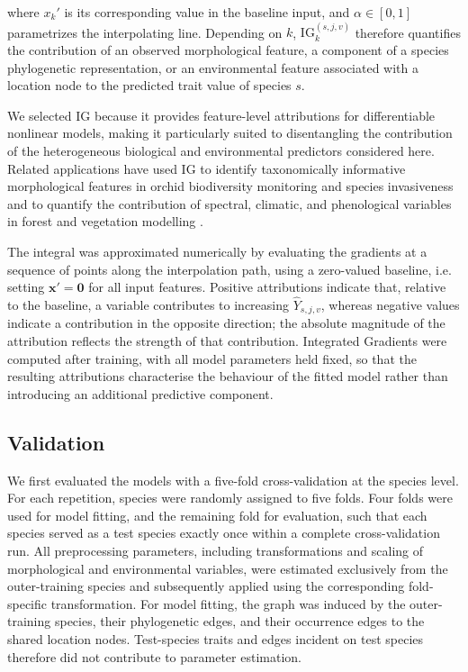\documentclass[preprint,12pt,authoryear]{elsarticle}
\begin{document}
where \(x_k'\) is its corresponding value in the baseline input, and \(\alpha\in[0,1]\) parametrizes the interpolating line. Depending on $k$, $\mathrm{IG}^{(s,j,v)}_k$ therefore quantifies the contribution of an observed morphological feature, a component of a species phylogenetic representation, or an environmental feature associated with a location node to the predicted trait value of species \(s\).

We selected IG because it provides feature-level attributions for differentiable nonlinear models, making it particularly suited to disentangling the contribution of the heterogeneous biological and environmental predictors considered here. Related applications have used IG to identify taxonomically informative morphological features in orchid biodiversity monitoring and species invasiveness \citep{sangiovanni2025orchid,SPINA2026103877} and to quantify the contribution of spectral, climatic, and phenological variables in forest and vegetation modelling \citep{hiebl2026combining}. 

The integral was approximated numerically by evaluating the gradients at a sequence of points along the interpolation path, using a zero-valued baseline, i.e. setting \(\mathbf{x}'=\mathbf{0}\) for all input features.
Positive attributions indicate that, relative to the baseline, a variable contributes to increasing \(\hat{Y}_{s,j,v}\), whereas negative values indicate a contribution in the opposite direction; the absolute magnitude of the attribution reflects the strength of that contribution. Integrated Gradients were computed after training, with all model parameters held fixed, so that the resulting attributions characterise the behaviour of the fitted model rather than introducing an additional predictive component.


\subsection{Validation}
We first evaluated the models with a five-fold cross-validation at the species level. For each repetition, species were randomly assigned to five folds. Four folds were used for model fitting, and the remaining fold for evaluation, such that each species served as a test species exactly once within a complete cross-validation run. All preprocessing parameters, including transformations and scaling of morphological and environmental variables, were estimated exclusively from the outer-training species and subsequently applied using the corresponding fold-specific transformation. For model fitting, the graph was induced by the outer-training species, their phylogenetic edges, and their occurrence edges to the shared location nodes. Test-species traits and edges incident on test species therefore did not contribute to parameter estimation.
\end{document}

